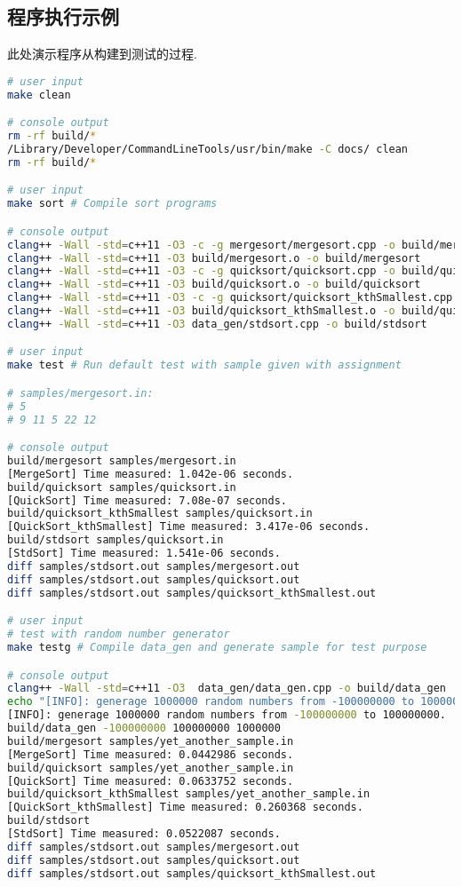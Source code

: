 \subsection{程序执行示例}
\label{sec:sortBench}
此处演示程序从构建到测试的过程.
\begin{lstlisting}[language=bash]
# user input
make clean

# console output
rm -rf build/*
/Library/Developer/CommandLineTools/usr/bin/make -C docs/ clean
rm -rf build/*

# user input
make sort # Compile sort programs

# console output
clang++ -Wall -std=c++11 -O3 -c -g mergesort/mergesort.cpp -o build/mergesort.o
clang++ -Wall -std=c++11 -O3 build/mergesort.o -o build/mergesort
clang++ -Wall -std=c++11 -O3 -c -g quicksort/quicksort.cpp -o build/quicksort.o
clang++ -Wall -std=c++11 -O3 build/quicksort.o -o build/quicksort
clang++ -Wall -std=c++11 -O3 -c -g quicksort/quicksort_kthSmallest.cpp -o build/quicksort_kthSmallest.o
clang++ -Wall -std=c++11 -O3 build/quicksort_kthSmallest.o -o build/quicksort_kthSmallest
clang++ -Wall -std=c++11 -O3 data_gen/stdsort.cpp -o build/stdsort

# user input
make test # Run default test with sample given with assignment

# samples/mergesort.in:
# 5
# 9 11 5 22 12

# console output
build/mergesort samples/mergesort.in
[MergeSort] Time measured: 1.042e-06 seconds.
build/quicksort samples/quicksort.in
[QuickSort] Time measured: 7.08e-07 seconds.
build/quicksort_kthSmallest samples/quicksort.in
[QuickSort_kthSmallest] Time measured: 3.417e-06 seconds.
build/stdsort samples/quicksort.in
[StdSort] Time measured: 1.541e-06 seconds.
diff samples/stdsort.out samples/mergesort.out
diff samples/stdsort.out samples/quicksort.out
diff samples/stdsort.out samples/quicksort_kthSmallest.out

# user input
# test with random number generator
make testg # Compile data_gen and generate sample for test purpose

# console output
clang++ -Wall -std=c++11 -O3  data_gen/data_gen.cpp -o build/data_gen
echo "[INFO]: generage 1000000 random numbers from -100000000 to 100000000."
[INFO]: generage 1000000 random numbers from -100000000 to 100000000.
build/data_gen -100000000 100000000 1000000
build/mergesort samples/yet_another_sample.in
[MergeSort] Time measured: 0.0442986 seconds.
build/quicksort samples/yet_another_sample.in
[QuickSort] Time measured: 0.0633752 seconds.
build/quicksort_kthSmallest samples/yet_another_sample.in
[QuickSort_kthSmallest] Time measured: 0.260368 seconds.
build/stdsort
[StdSort] Time measured: 0.0522087 seconds.
diff samples/stdsort.out samples/mergesort.out
diff samples/stdsort.out samples/quicksort.out
diff samples/stdsort.out samples/quicksort_kthSmallest.out


\end{lstlisting}
